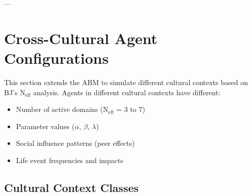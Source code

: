 ---


\section{Cross-Cultural Agent Configurations}
\label{ppp:crosscultural}

\begin{tcolorbox}[colback=orange!5!white, colframe=orange!75!black, title=Connection to Appendix BJ]
This section extends the ABM to simulate different cultural contexts based on BJ's
N$_{\text{eff}}$ analysis. Agents in different cultural contexts have different:
\begin{itemize}[nosep]
\item Number of active domains (N$_{\text{eff}}$ = 3 to 7)
\item Parameter values ($\alpha$, $\beta$, $\lambda$)
\item Social influence patterns (peer effects)
\item Life event frequencies and impacts
\end{itemize}
\end{tcolorbox}

\subsection{Cultural Context Classes}

